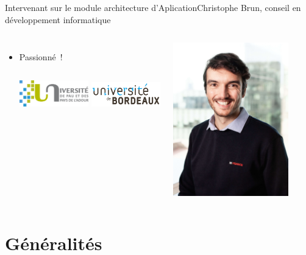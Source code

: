\documentclass{beamer}
\begin{document}
\begin{frame}{Intervenant sur le module architecture d'Aplication}{Christophe Brun, conseil en développement informatique}
\begin{columns}
\begin{itemize}
                \item Passionné~!
                \bigbreak
                \begin{columns}
                    \centering
                    \includegraphics[width=3cm]{image/logo-uppa}
                    \centering
                    \includegraphics[width=3cm]{image/logo-universite-bordeaux}
                \end{columns}
            \end{itemize}
            \centering
            \includegraphics[width=5cm]{image/trombine-christophe}
        \end{columns}
    \end{frame}


    \section{Généralités}\label{sec:generalites}
\end{document}
